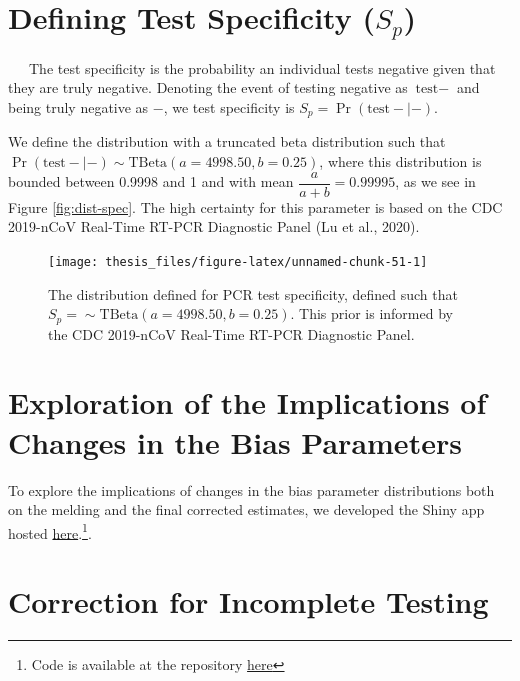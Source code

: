 \documentclass[12pt,twoside]{smiththesis}
\begin{document}
\hypertarget{defining-test-specificity-s_p}{%
\section{\texorpdfstring{Defining Test Specificity (\(S_p\))}{Defining Test Specificity (S\_p)}}\label{defining-test-specificity-s_p}}

~~~The test specificity is the probability an individual tests negative given that they are truly negative. Denoting the event of testing negative as \(\text{test} -\) and being truly negative as \(-\), we test specificity is \(S_p = \Pr(\text{test} - | -)\).

We define the distribution with a truncated beta distribution such that
\(\Pr(\text{test}-| -) \sim \text{TBeta}(a = 4998.50,b= 0.25)\), where this distribution is bounded between 0.9998 and 1 and with mean \(\dfrac{a}{a + b} = 0.99995\), as we see in Figure \ref{fig:dist-spec}. The high certainty for this parameter is based on the CDC 2019-nCoV Real-Time RT-PCR Diagnostic Panel (Lu et al., 2020).
\begin{figure}

{\centering \texttt{[image: thesis\_files/figure-latex/unnamed-chunk-51-1]} 

}

\caption{\label{fig:dist-spec} The distribution defined for PCR test specificity, defined such that  $S_p = \sim \text{TBeta}(a = 4998.50, b =  0.25)$. This prior is informed by the CDC 2019-nCoV Real-Time RT-PCR Diagnostic Panel.}\label{fig:unnamed-chunk-51}
\end{figure}
\hypertarget{exploration-of-the-implications-of-changes-in-the-bias-parameters}{%
\section{Exploration of the Implications of Changes in the Bias Parameters}\label{exploration-of-the-implications-of-changes-in-the-bias-parameters}}

To explore the implications of changes in the bias parameter distributions both on the melding and the final corrected estimates, we developed the Shiny app hosted \href{https://q-w-a.shinyapps.io/bayesian_melding_priors/}{here}.\footnote{Code is available at the repository \href{https://github.com/q-w-a/probabilistic_bias_correction}{here}}.

\hypertarget{correction-for-incomplete-testing}{%
\section{Correction for Incomplete Testing}\label{correction-for-incomplete-testing}}
\end{document}
